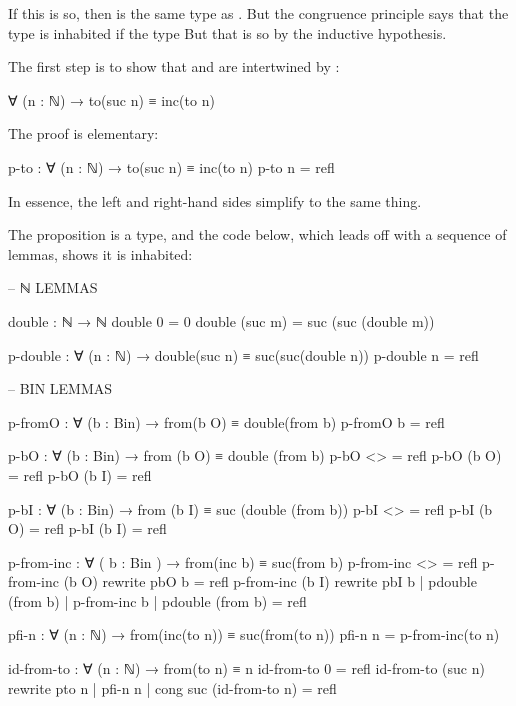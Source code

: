 If this is so, then  is the same type as . But the congruence principle says that the type
 is inhabited if the type 
But that is so by the inductive hypothesis.



\bigskip


The first step is to show that  and  are intertwined by :

\begin{colored}[elm]
∀ (n : ℕ) → to(suc n) ≡ inc(to n)

\end{colored}

The proof is elementary:

\begin{colored}[elm]
p-to : ∀ (n : ℕ) → to(suc n) ≡ inc(to n)
p-to n = refl
\end{colored}

In essence, the left and right-hand sides simplify to the same thing.

The proposition  is a type, and the code below, which leads off with a sequence of lemmas, shows it is inhabited:

\begin{colored}[elm]
-- ℕ LEMMAS

double : ℕ → ℕ
double 0 = 0
double (suc m) = suc (suc (double m))

p-double : ∀ (n : ℕ) → double(suc n) ≡ suc(suc(double n))
p-double n = refl
\end{colored}

\begin{colored}[elm]
-- BIN LEMMAS

p-fromO : ∀ (b : Bin) → from(b O) ≡ double(from b)
p-fromO b = refl

p-bO : ∀ (b : Bin) → from (b O) ≡ double (from b)
p-bO <> = refl
p-bO (b O) = refl
p-bO (b I) = refl

p-bI : ∀ (b : Bin) → from (b I) ≡ suc (double (from b))
p-bI <> = refl
p-bI (b O) = refl
p-bI (b I) = refl

p-from-inc : ∀ ( b : Bin ) → from(inc b) ≡ suc(from b)
p-from-inc <> = refl
p-from-inc (b O)  rewrite pbO b = refl
p-from-inc (b I) rewrite pbI b | pdouble (from b) | 
      p-from-inc b | pdouble (from b) = refl

pfi-n : ∀ (n : ℕ) → from(inc(to n)) ≡ suc(from(to n))
pfi-n n = p-from-inc(to n)

id-from-to : ∀ (n : ℕ) → from(to n) ≡ n
id-from-to 0 = refl
id-from-to (suc n) rewrite pto n | pfi-n n | 
    cong suc (id-from-to n) = refl
\end{colored}

